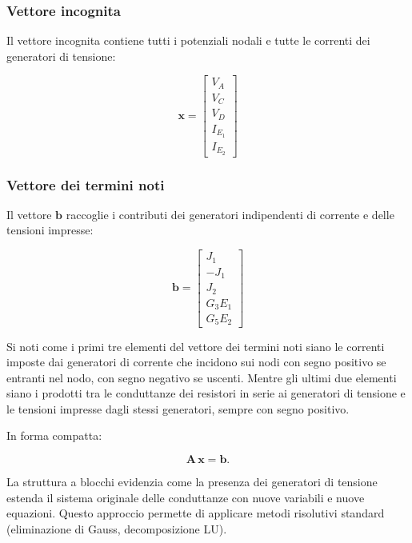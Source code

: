 \subsubsection*{Vettore incognita}

Il vettore incognita contiene tutti i potenziali nodali e tutte le correnti dei generatori di tensione:

\begin{equation}
    \mathbf{x} = 
    \begin{bmatrix}
        V_A \\ V_C \\ V_D \\ I_{E_1} \\ I_{E_2}
    \end{bmatrix}
\end{equation}

\subsubsection*{Vettore dei termini noti}

Il vettore \(\mathbf{b}\) raccoglie i contributi dei generatori indipendenti di corrente e delle tensioni impresse:

\begin{equation}
    \mathbf{b} = 
    \begin{bmatrix}
    J_1 \\ - J_1 \\ J_2 \\ G_3E_1 \\ G_5E_2
    \end{bmatrix}
\end{equation}

Si noti come i primi tre elementi del vettore dei termini noti siano le correnti imposte dai generatori di corrente che incidono sui nodi con segno positivo se entranti nel nodo, con segno negativo se uscenti. Mentre gli ultimi due elementi siano i prodotti tra le conduttanze dei resistori in serie ai generatori di tensione e le tensioni impresse dagli stessi generatori, sempre con segno positivo.

In forma compatta:

\begin{equation}
    \mathbf{A} \, \mathbf{x} = \mathbf{b}.
\end{equation}

La struttura a blocchi evidenzia come la presenza dei generatori di tensione estenda il sistema originale delle conduttanze con nuove variabili e nuove equazioni. Questo approccio permette di applicare metodi risolutivi standard (eliminazione di Gauss, decomposizione LU).